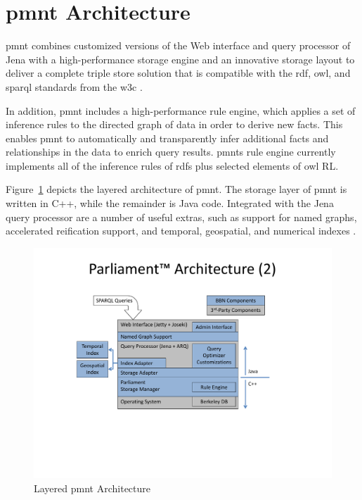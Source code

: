 \section{\ac{pmnt} Architecture}

\ac{pmnt} combines customized versions of the Web interface and query processor of Jena with a high-performance storage engine and an innovative storage layout to deliver a complete triple store solution that is compatible with the  \ac{rdf}, \ac{owl}, and \ac{sparql} standards from the \ac{w3c} \autocite{KoEmDe:09:ParliamentIndexing}.

In addition, \ac{pmnt} includes a high-performance rule engine, which applies a set of inference rules to the directed graph of data in order to derive new facts.  This enables \ac{pmnt} to automatically and transparently infer additional facts and relationships in the data to enrich query results.  \acp{pmnt} rule engine currently implements all of the inference rules of \ac{rdfs} plus selected elements of \ac{owl} RL.

Figure~\ref{figure-parliament-layers} depicts the layered architecture of \ac{pmnt}.  The storage layer of \ac{pmnt} is written in C++, while the remainder is Java code.  Integrated with the Jena query processor are a number of useful extras, such as support for named graphs, accelerated reification support, and temporal, geospatial, and numerical indexes \autocites{Ko:2010}{BaKo:2012}.

\begin{figure}[htbp]
	\centering
	\includegraphics[width=1.0\textwidth]{architecture.pdf}
	\caption{Layered \ac{pmnt} Architecture}
	\label{figure-parliament-layers}
\end{figure}
